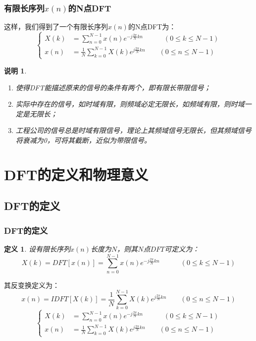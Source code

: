 \documentclass[notheorems,compress,mathserif,table]{beamer}
\newtheorem{definition}{定义}
\newtheorem{shuoming}{说明}
\begin{document}
\begin{frame}[shrink]\frametitle{有限长序列$x(n)$的N点DFT}%
    这样，我们得到了一个有限长序列$x(n)$的N点DFT为：
    \begin{equation*}
           \left\{ \begin{aligned}
               X(k) &=  \sum_{n=0}^{N-1}x(n)e^{-j\frac{2\pi}{N}kn}  \quad\quad\quad (0 \leq k \leq N-1) \\
               x(n) &=   \frac{1}{N}\sum_{k=0}^{N-1}X(k)e^{j\frac{2\pi}{N}kn} \quad\quad (0 \leq n \leq N-1)
           \end{aligned} \right.
    \end{equation*}
\begin{shuoming}
    \begin{enumerate}
      \item 使得DFT能描述原来的信号的条件有两个，即有限长带限信号；
      \item 实际中存在的信号，如时域有限，则频域必定无限长，如频域有限，则时域一定是无限长；
      \item 工程公司的信号总是时域有限信号，理论上其频域信号无限长，但其频域信号将衰减为0，可将其截断，近似为带限信号。
    \end{enumerate}
\end{shuoming}
\end{frame}
%
%
%
%
\section{DFT的定义和物理意义}

\subsection{DFT的定义}
%
%
\begin{frame}[shrink]\frametitle{DFT的定义}%
\begin{definition}
设有限长序列$x(n)$长度为$N$，则其$N$点$DFT$可定义为：
    $$X(k) = DFT[x(n)] =  \sum_{n=0}^{N-1}x(n)e^{-j\frac{2\pi}{N}kn}  \quad\quad\quad (0 \leq k \leq N-1)$$
\end{definition}



    其反变换定义为：
    $$x(n) = IDFT[X(k)] =   \frac{1}{N}\sum_{k=0}^{N-1}X(k)e^{j\frac{2\pi}{N}kn} \quad\quad (0 \leq n \leq N-1)$$
    \begin{equation*}
           \left\{ \begin{aligned}
               X(k) &=  \sum_{n=0}^{N-1}x(n)e^{-j\frac{2\pi}{N}kn}  \quad\quad\quad (0 \leq k \leq N-1) \\
               x(n) &=   \frac{1}{N}\sum_{k=0}^{N-1}X(k)e^{j\frac{2\pi}{N}kn} \quad\quad (0 \leq n \leq N-1)
           \end{aligned} \right.
    \end{equation*}
\end{frame}
\end{document}

